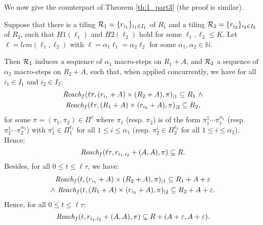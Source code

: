 We now give the counterpart of Theorem \ref{th:1_part3} (the proof is similar).

\begin{theorem}\label{th:2}
Suppose that there is a tiling ${\cal R}_1=\{r_{i_1}\}_{i_1\in I_1}$ of $R_1$
and a tiling ${\cal R}_2=\{r_{i_2}\}_{i_2\in I_2}$ of $R_2$,
such that
$H1(\ell_1)$ and $H2(\ell_2)$ hold
for some $\ell_1,\ell_2 \leq K$.
Let $\ell=lcm(\ell_1,\ell_2)$ with $\ell=\alpha_1 \ell_1=\alpha_2 \ell_2$
for some $\alpha_1,\alpha_2\in \mathbb{N}$.

Then
${\cal R}_1$ induces a 
sequence of $\alpha_1$ macro-steps on $R_1+A$, and ${\cal R}_2$
a sequence of $\alpha_2$ macro-steps on $R_2+A$, such that, 
when applied concurrently, we have
for all $i_1\in I_1$ and $i_2\in I_2$:
\begin{multline*}
\Reach_f(\ell \tau,(r_{i_1}+A)\times (R_2+A),\pi)_{|1}\subseteq R_1 \ \wedge\\ 
\Reach_f(\ell \tau,(R_1+A)\times (r_{i_2}+A),\pi)_{|2}\subseteq R_2,
\end{multline*}
for some $\pi=(\pi_1,\pi_2)\in \Pi^{\ell}$ where $\pi_1$ (resp. $\pi_2$)
is of the form $\pi_1^1\cdots \pi_1^{\alpha_1}$
(resp. $\pi_2^1\cdots \pi_2^{\alpha_2}$)
with $\pi_1^i\in \Pi_1^{\ell_1}$  for all $1\leq i\leq \alpha_1$
(resp. $\pi_2^i\in \Pi_2^{\ell_2}$  for all $1\leq i\leq \alpha_2$).
%
Hence:
$$\textit{Reach}_f(\ell\tau,r_{i_1,i_2}+(A,A),\pi)\subseteq R.$$
Besides, for all $0\leq t \leq \ell\tau$,
we have:
\begin{multline*}
  \textit{Reach}_f(t,(r_{i_1}+A)\times (R_2+A),\pi)_{|1}\subseteq R_1+A+\varepsilon\\ 
  \wedge\ \textit{Reach}_f(t,(R_1+A)\times (r_{i_2}+A),\pi)_{|2}\subseteq R_2+A+\varepsilon.
\end{multline*}
%
Hence, for all $0\leq t \leq \ell\tau$:
$$\textit{Reach}_f(t,r_{i_1,i_2}+(A,A),\pi)\subseteq R+(A+\varepsilon,A+\varepsilon).$$
\end{theorem}


